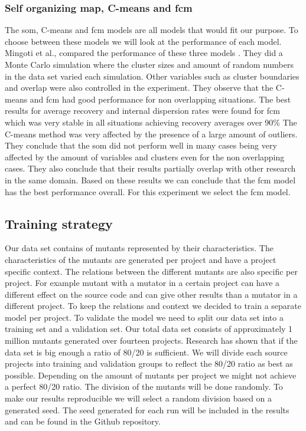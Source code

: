 \documentclass[../../main]{subfiles}
\begin{document}
\subsubsection{Self organizing map, C-means and \acrlong{fcm}}
\label{ch:topThreeModels}
The \acrfull{som}, C-means and \acrfull{fcm} models are all models that would fit our purpose. 
To choose between these models we will look at the performance of each model.
Mingoti et al., compared the performance of these three models \cite{Mingoti2006ComparingAlgorithms}.
They did a Monte Carlo simulation where the cluster sizes and amount of random numbers in the data set varied each simulation\cite{Mingoti2006ComparingAlgorithms}.
Other variables such as cluster boundaries and overlap were also controlled in the experiment.
They observe that the C-means and \acrlong{fcm} had good performance for non overlapping situations\cite{Mingoti2006ComparingAlgorithms}.
The best results for average recovery and internal dispersion rates were found for \acrlong{fcm} which was very stable in all situations achieving recovery averages over 90\%\cite{Mingoti2006ComparingAlgorithms}
The C-means method was very affected by the presence of a large amount of outliers.
They conclude that the \acrshort{som} did not perform well in many cases being very affected by the amount of variables and clusters even for the non overlapping cases\cite{Mingoti2006ComparingAlgorithms}.
They also conclude that their results partially overlap with other research in the same domain.
\newline
Based on these results we can conclude that the \acrshort{fcm} model has the best performance overall.
For this experiment we select the \acrshort{fcm} model.

\subsection{Training strategy}
\label{ch:training_strategy}
Our data set contains of mutants represented by their characteristics. 
The characteristics of the mutants are generated per project and have a project specific context.
The relations between the different mutants are also specific per project.
For example mutant with a mutator in a certain project can have a different effect on the source code and can give other results than a mutator in a different project.
To keep the relations and context we decided to train a separate model per project.
\newline
To validate the model we need to split our data set into a training set and a validation set.
Our total data set consists of approximately 1 million mutants generated over fourteen projects.
Research has shown that if the data set is big enough a ratio of 80/20 is sufficient\cite{Guyon1997ARatio}.
We will divide each source projects into training and validation groups to reflect the 80/20 ratio as best as possible.
Depending on the amount of mutants per project we might not achieve a perfect 80/20 ratio.
The division of the mutants will be done randomly. 
To make our results reproducible we will select a random division based on a generated seed.
The seed generated for each run will be included in the results and can be found in the Github repository\cite{rbasarat-repo}.
\end{document}
